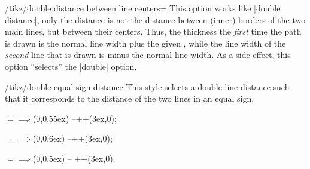 \begin{key}{/tikz/double distance between line centers=}
    This option works like |double distance|, only the distance is not the
    distance between (inner) borders of the two main lines, but between their
    centers. Thus, the thickness the \emph{first} time the path is drawn is the
    normal line width plus the given , while the line width of
    the \emph{second} line that is drawn is  minus the normal
    line width. As a side-effect, this option ``selects'' the |double| option.
\begin{codeexample}[]
\end{codeexample}
\begin{codeexample}[]
\end{codeexample}
\end{key}

\begin{stylekey}{/tikz/double equal sign distance}
    This style selects a double line distance such that it corresponds to the
    distance of the two lines in an equal sign.
\begin{codeexample}[
    preamble={\usepackage{amsmath}
\usetikzlibrary{arrows.meta}},pre={\begin{lateximage}},post={\end{lateximage}}
]
\Huge $=\implies$
                    (0,0.55ex) --++(3ex,0);
\end{codeexample}
\begin{codeexample}[
    preamble={\usepackage{amsmath}
\usetikzlibrary{arrows.meta}},pre={\begin{lateximage}},post={\end{lateximage}}
]
\normalsize $=\implies$
                          (0,0.6ex) --++(3ex,0);
\end{codeexample}
\begin{codeexample}[
    preamble={\usepackage{amsmath}
\usetikzlibrary{arrows.meta}},pre={\begin{lateximage}},post={\end{lateximage}}
]
\tiny $=\implies$
                   (0,0.5ex) -- ++(3ex,0);
\end{codeexample}
\end{stylekey}


